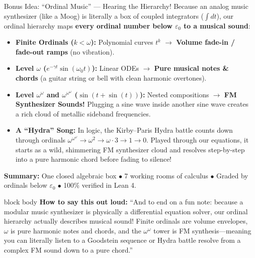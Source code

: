\documentclass[aspectratio=169,11pt]{beamer}
\newcommand{\say}[1]{%
  \vfill
  \begin{beamercolorbox}[sep=5pt,rounded=true,shadow=false]{block body}
  {\footnotesize \textbf{\textcolor{deepblue}{How to say this out loud:}} ``#1''}
  \end{beamercolorbox}
}
\begin{document}
\begin{frame}[shrink=8]{Bonus Idea: ``Ordinal Music'' --- Hearing the Hierarchy!}
  Because an analog music synthesizer (like a Moog) is literally a box of coupled integrators ($\int dt$), our ordinal hierarchy maps \textbf{every ordinal number below $\varepsilon_0$ to a musical sound}:

  \vspace{0.1cm}
  \begin{itemize}
    \item \textbf{Finite Ordinals ($k < \omega$):} Polynomial curves $t^k$ $\longrightarrow$ \textbf{Volume fade-in / fade-out ramps} (no vibration).
    \item \textbf{Level $\omega$ ($e^{-\gamma t}\sin(\omega_0 t)$):} Linear ODEs $\longrightarrow$ \textbf{Pure musical notes \& chords} (a guitar string or bell with clean harmonic overtones).
    \item \textbf{Level $\omega^\omega$ and $\omega^{\omega^\omega}$ ($\sin(t + \sin(t))$):} Nested compositions $\longrightarrow$ \textbf{FM Synthesizer Sounds!} Plugging a sine wave inside another sine wave creates a rich cloud of metallic sideband frequencies.
    \item \textbf{A ``Hydra'' Song:} In logic, the Kirby--Paris Hydra battle counts down through ordinals $\omega^{\omega^\omega} \to \omega^2 \to \omega \cdot 3 \to 1 \to 0$. Played through our equations, it starts as a wild, shimmering FM synthesizer cloud and resolves step-by-step into a pure harmonic chord before fading to silence!
  \end{itemize}

  \vspace{0.15cm}
  \begin{center}
    \textbf{\textcolor{deepblue}{Summary:}} One closed algebraic box $\bullet$ 7 working rooms of calculus $\bullet$ Graded by ordinals below $\varepsilon_0$ $\bullet$ 100\% verified in Lean 4.
  \end{center}

  \say{And to end on a fun note: because a modular music synthesizer is physically a differential equation solver, our ordinal hierarchy actually describes musical sound! Finite ordinals are volume envelopes, $\omega$ is pure harmonic notes and chords, and the $\omega^\omega$ tower is FM synthesis---meaning you can literally listen to a Goodstein sequence or Hydra battle resolve from a complex FM sound down to a pure chord.}
\end{frame}
\end{document}

